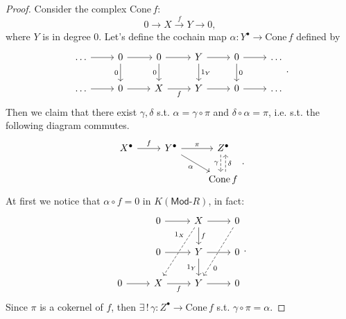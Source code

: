 \begin{proof}
	Consider the complex $\mathrm{Cone}\, f$:
	\begin{equation}
		0 \to X \xrightarrow{f} Y \to 0
	,\end{equation} 
	where $Y$ is in degree $0$.
	Let's define the cochain map $\alpha: Y^\bullet \to \mathrm{Cone}\, f$
	defined by
	\begin{equation}
	\begin{tikzcd}
		\ldots \arrow[r, "", rightarrow] &
		0 \arrow[r, "", rightarrow] \arrow[d, "0"', rightarrow] &
		0 \arrow[r, "", rightarrow] \arrow[d, "0"', rightarrow] &
		Y \arrow[r, "", rightarrow] \arrow[d, "1_Y", rightarrow] &
		0 \arrow[r, "", rightarrow] \arrow[d, "0", rightarrow] &
		\ldots \\
		\ldots \arrow[r, "", rightarrow] &
		0 \arrow[r, "", rightarrow] &
		X \arrow[r, "f"', rightarrow] &
		Y \arrow[r, "", rightarrow] &
		0 \arrow[r, "", rightarrow] & \ldots
	\end{tikzcd}
	.\end{equation} 
	Then we claim that there exist $\gamma, \delta$ s.t. $\alpha = \gamma \circ \pi$ and $\delta \circ \alpha = \pi$,
	i.e. s.t. the following diagram commutes.
	\begin{equation}
		\begin{tikzcd}
		X^\bullet \arrow[r, "f", rightarrow] &
		Y^\bullet \arrow[r, "\pi", rightarrow] \arrow[dr, "\alpha"', rightarrow] &
		Z^\bullet \arrow[d, "\gamma"', dashrightarrow, shift right = 0.25em] \\
		& &
		\mathrm{Cone}\, f \arrow[u, "\delta"', dashrightarrow, shift right = 0.25em]
	\end{tikzcd}
	.\end{equation} 
	At first we notice that $\alpha \circ f = 0 $ in $K(\mathsf{Mod}\text{-}R)$, in fact:
	\begin{equation}
	\begin{tikzcd}
		&
		0 \arrow[r, "", rightarrow] &
		X \arrow[r, "", rightarrow] \arrow[d, "f", rightarrow] \arrow[ddl, "1_X"' near start, dashrightarrow, crossing over] &
		0 \arrow[ldd, "0" near end, dashrightarrow, crossing over]\\
		&
		0 \arrow[r, "", rightarrow] &
		Y \arrow[r, "", rightarrow] \arrow[d, "1_Y"', rightarrow] &
		0 \\
		0 \arrow[r, "", rightarrow] &
		X \arrow[r, "f"', rightarrow] &
		Y \arrow[r, "", rightarrow] &
		0
	\end{tikzcd}
	.\end{equation} 
	Since $\pi$ is a cokernel of $f$, then $\exists\, !\, \gamma: Z^\bullet \to \mathrm{Cone}\, f$ s.t. $\gamma \circ \pi = \alpha$.

\end{proof}
